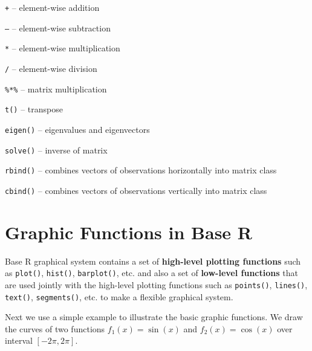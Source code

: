 \documentclass[
]{book}
\begin{document}
\texttt{+} -- element-wise addition

\texttt{–} -- element-wise subtraction

\texttt{*} -- element-wise multiplication

\texttt{/} -- element-wise division

\texttt{\%*\%} -- matrix multiplication

\texttt{t()} -- transpose

\texttt{eigen()} -- eigenvalues and eigenvectors

\texttt{solve()} -- inverse of matrix

\texttt{rbind()} -- combines vectors of observations horizontally into matrix class

\texttt{cbind()} -- combines vectors of observations vertically into matrix class

\hfill\break

\hypertarget{graphic-functions-in-base-r}{%
\section{Graphic Functions in Base R}\label{graphic-functions-in-base-r}}

Base R graphical system contains a set of \textbf{high-level plotting functions} such as \texttt{plot()}, \texttt{hist()}, \texttt{barplot()}, etc. and also a set of \textbf{low-level functions} that are used jointly with the high-level plotting functions such as \texttt{points()}, \texttt{lines()}, \texttt{text()}, \texttt{segments()}, etc. to make a flexible graphical system.

Next we use a simple example to illustrate the basic graphic functions. We draw the curves of two functions \(f_1(x) = \sin(x)\) and \(f_2(x) = \cos(x)\) over interval \([-2\pi, 2\pi]\).
\end{document}

